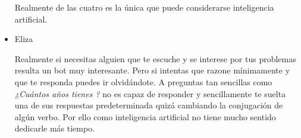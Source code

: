 \documentclass[spanish, a4paper, 12pt]{article} 	%
\begin{document}
\begin{section}
\begin{itemize}
		Realmente de las cuatro es la única que puede considerarse inteligencia artificial.
		\item{Eliza}
		
	Realmente si necesitas alguien que te escuche y se interese por tus problemas resulta un bot muy interesante. Pero si intentas que razone mínimamente y que te responda puedes ir olvidándote. A preguntas tan sencillas como  \textit{¿Cuántos años tienes ?} no es capaz de responder y sencillamente te suelta una de sus respuestas predeterminada quizá cambiando la conjugación de algún verbo. Por ello como inteligencia artificial no tiene mucho sentido dedicarle más tiempo.
	
	\end{itemize}
\end{section}
\end{document}
